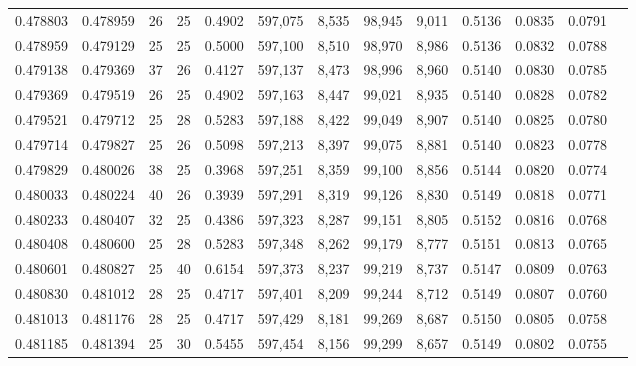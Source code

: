 \begin{tabular}{rrrrrrrrrrrrr}
0.478803 & 0.478959 &    26 &  25 &                                     0.4902 & 597,075 &   8,535 &  98,945 &   9,011 & 0.5136 & 0.0835 & 0.0791 \\
0.478959 & 0.479129 &    25 &  25 &                                     0.5000 & 597,100 &   8,510 &  98,970 &   8,986 & 0.5136 & 0.0832 & 0.0788 \\
0.479138 & 0.479369 &    37 &  26 &                                     0.4127 & 597,137 &   8,473 &  98,996 &   8,960 & 0.5140 & 0.0830 & 0.0785 \\
0.479369 & 0.479519 &    26 &  25 &                                     0.4902 & 597,163 &   8,447 &  99,021 &   8,935 & 0.5140 & 0.0828 & 0.0782 \\
0.479521 & 0.479712 &    25 &  28 &                                     0.5283 & 597,188 &   8,422 &  99,049 &   8,907 & 0.5140 & 0.0825 & 0.0780 \\
0.479714 & 0.479827 &    25 &  26 &                                     0.5098 & 597,213 &   8,397 &  99,075 &   8,881 & 0.5140 & 0.0823 & 0.0778 \\
0.479829 & 0.480026 &    38 &  25 &                                     0.3968 & 597,251 &   8,359 &  99,100 &   8,856 & 0.5144 & 0.0820 & 0.0774 \\
0.480033 & 0.480224 &    40 &  26 &                                     0.3939 & 597,291 &   8,319 &  99,126 &   8,830 & 0.5149 & 0.0818 & 0.0771 \\
0.480233 & 0.480407 &    32 &  25 &                                     0.4386 & 597,323 &   8,287 &  99,151 &   8,805 & 0.5152 & 0.0816 & 0.0768 \\
0.480408 & 0.480600 &    25 &  28 &                                     0.5283 & 597,348 &   8,262 &  99,179 &   8,777 & 0.5151 & 0.0813 & 0.0765 \\
0.480601 & 0.480827 &    25 &  40 &                                     0.6154 & 597,373 &   8,237 &  99,219 &   8,737 & 0.5147 & 0.0809 & 0.0763 \\
0.480830 & 0.481012 &    28 &  25 &                                     0.4717 & 597,401 &   8,209 &  99,244 &   8,712 & 0.5149 & 0.0807 & 0.0760 \\
0.481013 & 0.481176 &    28 &  25 &                                     0.4717 & 597,429 &   8,181 &  99,269 &   8,687 & 0.5150 & 0.0805 & 0.0758 \\
0.481185 & 0.481394 &    25 &  30 &                                     0.5455 & 597,454 &   8,156 &  99,299 &   8,657 & 0.5149 & 0.0802 & 0.0755 \\

\end{tabular}
